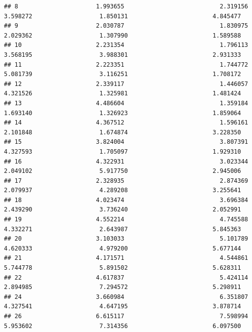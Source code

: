 \documentclass[
]{article}
\begin{document}
\begin{verbatim}
## 8                      1.993655                           2.319156                      3.598272                   1.850131                        4.845477
## 9                      2.030787                           1.830975                      2.029362                   1.307990                        1.589588
## 10                     2.231354                           1.796113                      3.568195                   3.988301                        2.931333
## 11                     2.223351                           1.744772                      5.081739                   3.116251                        1.708172
## 12                     2.339117                           1.446057                      4.321526                   1.325981                        1.481424
## 13                     4.486604                           1.359184                      1.693140                   1.326923                        1.859064
## 14                     4.367512                           1.596161                      2.101848                   1.674874                        3.228350
## 15                     3.824004                           3.807391                      4.327593                   1.705097                        1.929310
## 16                     4.322931                           3.023344                      2.049102                   5.917750                        2.945006
## 17                     2.328935                           2.874369                      2.079937                   4.289208                        3.255641
## 18                     4.023474                           3.696384                      2.439290                   3.736240                        2.052991
## 19                     4.552214                           4.745588                      4.332271                   2.643987                        5.845363
## 20                     3.103033                           5.101789                      4.620333                   4.979200                        5.677144
## 21                     4.171571                           4.544861                      5.744778                   5.891502                        5.628311
## 22                     4.617837                           5.424114                      2.894985                   7.294572                        5.298911
## 24                     3.660984                           6.351807                      4.327541                   4.647195                        3.878714
## 26                     6.615117                           7.598994                      5.953602                   7.314356                        6.097500

\end{verbatim}
\end{document}
